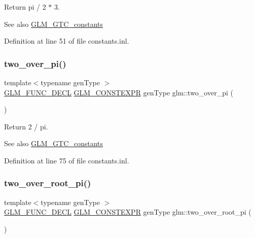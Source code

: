 Return pi / 2 $\ast$ 3. \begin{DoxySeeAlso}{See also}
\mbox{\hyperlink{group__gtc__constants}{G\+L\+M\+\_\+\+G\+T\+C\+\_\+constants}} 
\end{DoxySeeAlso}


Definition at line 51 of file constants.\+inl.

\mbox{\label{group__gtc__constants_ga74eadc8a211253079683219a3ea0462a}} 
\subsubsection{\texorpdfstring{two\_over\_pi()}{two\_over\_pi()}}
{\footnotesize\ttfamily template$<$typename gen\+Type $>$ \\
\mbox{\hyperlink{setup_8hpp_ab2d052de21a70539923e9bcbf6e83a51}{G\+L\+M\+\_\+\+F\+U\+N\+C\+\_\+\+D\+E\+CL}} \mbox{\hyperlink{setup_8hpp_a08b807947b47031d3a511f03f89645ad}{G\+L\+M\+\_\+\+C\+O\+N\+S\+T\+E\+X\+PR}} gen\+Type glm\+::two\+\_\+over\+\_\+pi (\begin{DoxyParamCaption}{ }\end{DoxyParamCaption})}

Return 2 / pi. \begin{DoxySeeAlso}{See also}
\mbox{\hyperlink{group__gtc__constants}{G\+L\+M\+\_\+\+G\+T\+C\+\_\+constants}} 
\end{DoxySeeAlso}


Definition at line 75 of file constants.\+inl.

\mbox{\label{group__gtc__constants_ga5827301817640843cf02026a8d493894}} 
\subsubsection{\texorpdfstring{two\_over\_root\_pi()}{two\_over\_root\_pi()}}
{\footnotesize\ttfamily template$<$typename gen\+Type $>$ \\
\mbox{\hyperlink{setup_8hpp_ab2d052de21a70539923e9bcbf6e83a51}{G\+L\+M\+\_\+\+F\+U\+N\+C\+\_\+\+D\+E\+CL}} \mbox{\hyperlink{setup_8hpp_a08b807947b47031d3a511f03f89645ad}{G\+L\+M\+\_\+\+C\+O\+N\+S\+T\+E\+X\+PR}} gen\+Type glm\+::two\+\_\+over\+\_\+root\+\_\+pi (\begin{DoxyParamCaption}{ }\end{DoxyParamCaption})}


